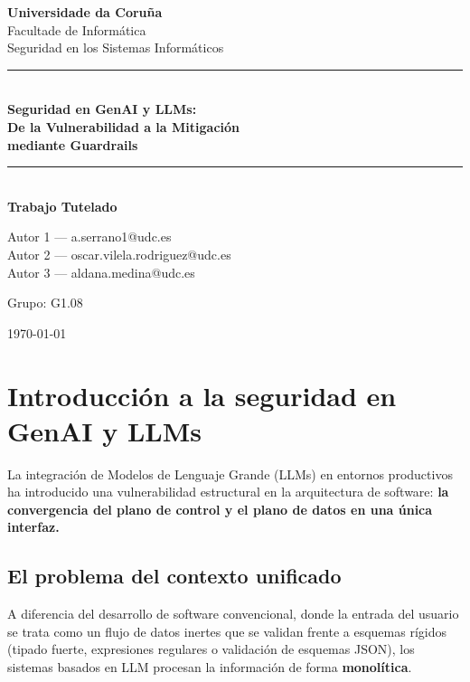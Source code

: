 \documentclass[12pt]{article}
\begin{document}
\begin{titlepage}
\centering
\vspace*{2cm}

{\Large\textbf{Universidade da Coruña}\\[0.3cm]}
{\large Facultade de Informática\\[0.2cm]}
{\large Seguridad en los Sistemas Informáticos\\[1.5cm]}

\rule{\textwidth}{1pt}\\[0.5cm]
{\LARGE\bfseries Seguridad en GenAI y LLMs:\\[0.3cm]
De la Vulnerabilidad a la Mitigación\\[0.3cm]
mediante Guardrails}\\[0.5cm]
\rule{\textwidth}{1pt}\\[1.5cm]

{\large\textbf{Trabajo Tutelado}\\[1cm]}

{\large

Autor 1 --- a.serrano1@udc.es\\
Autor 2 --- oscar.vilela.rodriguez@udc.es\\
Autor 3 --- aldana.medina@udc.es\\[1cm]
}

{\large Grupo: G1.08\\[1cm]}

{\large \today}

\vfill
\end{titlepage}

\tableofcontents
\newpage


\section{Introducción a la seguridad en GenAI y LLMs}
La integración de Modelos de Lenguaje Grande (LLMs) en entornos productivos ha introducido una vulnerabilidad estructural en la arquitectura de software: \textbf{la convergencia del plano de control y el plano de datos en una única interfaz.}

\subsection{El problema del contexto unificado}
A diferencia del desarrollo de software convencional, donde la entrada del usuario se trata como un flujo de datos inertes que se validan frente a esquemas rígidos (tipado fuerte, expresiones regulares o validación de esquemas JSON), los sistemas basados en LLM procesan la información de forma \textbf{monolítica}. 
\end{document}
